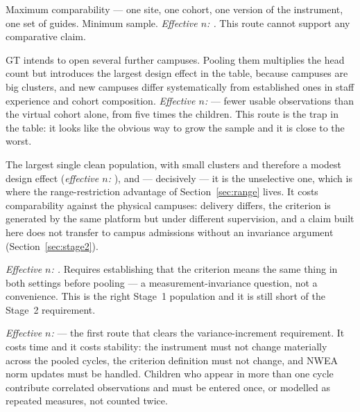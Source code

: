 \documentclass[11pt,a4paper]{article}
\begin{document}
\begin{description}[leftmargin=0em,itemsep=0.35em]

\item[One campus, one cycle (\NcampusCohort{}).] Maximum comparability --- one
site, one cohort, one version of the instrument, one set of guides. Minimum
sample. \emph{Effective $n$: \EffNcampus{}.} This route cannot support any
comparative claim.

\item[All physical campuses after the planned expansion ($\approx246$).] GT
intends to open several further campuses. Pooling them multiplies the head count
but introduces the largest design effect in the table, because campuses are big
clusters, and new campuses differ systematically from established ones in staff
experience and cohort composition. \emph{Effective $n$: \EffNexpansion{}} ---
fewer usable observations than the virtual cohort alone, from five times the
children. This route is the trap in the table: it looks like the obvious way to
grow the sample and it is close to the worst.

\item[The virtual cohort, one cycle (\NanywhereCohort{}).] The largest single
clean population, with small clusters and therefore a modest design effect
(\emph{effective $n$: \EffNanywhere{}}), and --- decisively --- it is the
unselective one, which is where the range-restriction advantage of
Section~\ref{sec:range} lives. It costs comparability against the physical
campuses: delivery differs, the criterion is generated by the same platform but
under different supervision, and a claim built here does not transfer to campus
admissions without an invariance argument
(Section~\ref{sec:stage2}).

\item[Every enrolled child, one cycle (\Nbothcohorts{}).] \emph{Effective $n$:
\EffNboth{}.} Requires establishing that the criterion means the same thing in
both settings before pooling --- a measurement-invariance question, not a
convenience. This is the right Stage~1 population and it is still short of the
Stage~2 requirement.

\item[Three consecutive admission cycles ($\approx1{,}038$).] \emph{Effective
$n$: \EffNthreeCycles{}} --- the first route that clears the variance-increment
requirement. It costs time and it costs stability: the instrument must not
change materially across the pooled cycles, the criterion definition must not
change, and NWEA norm updates must be handled. Children who appear in more than
one cycle contribute correlated observations and must be entered once, or
modelled as repeated measures, not counted twice.


\end{description}
\end{document}
